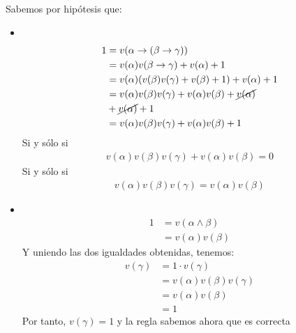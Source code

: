 \begin{ejercicio*}
\begin{enumerate}
    Sabemos por hipótesis que:
    \begin{itemize}
        \item \ 
            \begin{align*}
                1 &= v(\alpha\rightarrow(\beta\rightarrow\gamma)) \\
                  &= v(\alpha)v(\beta\rightarrow\gamma) + v(\alpha) + 1\\
                  &= v(\alpha)(v(\beta)v(\gamma) + v(\beta)+1)+v(\alpha)+1 \\
                  &= v(\alpha)v(\beta)v(\gamma) + v(\alpha)v(\beta)+\cancel{v(\alpha)} \\
                  &+ \cancel{v(\alpha)} + 1 \\
                  &= v(\alpha)v(\beta)v(\gamma)+v(\alpha)v(\beta)+1
            \end{align*}
            Si y sólo si
            \begin{align*}
                v(\alpha)v(\beta)v(\gamma)+v(\alpha)v(\beta) = 0 
            \end{align*}
            Si y sólo si
            \begin{align*}
                v(\alpha)v(\beta)v(\gamma) = v(\alpha)v(\beta)
            \end{align*}
        \item \ 
            \begin{align*}
                1 &= v(\alpha\land\beta) \\
                  &= v(\alpha)v(\beta)
            \end{align*}
            Y uniendo las dos igualdades obtenidas, tenemos:
            \begin{align*}
                v(\gamma) &= 1\cdot v(\gamma) \\
                          &= v(\alpha)v(\beta)v(\gamma) \\
                          &= v(\alpha)v(\beta) \\
                          &= 1
            \end{align*}
            Por tanto, $v(\gamma)=1$ y la regla sabemos ahora que es correcta 
    \end{itemize}


\end{enumerate}
\end{ejercicio*}
